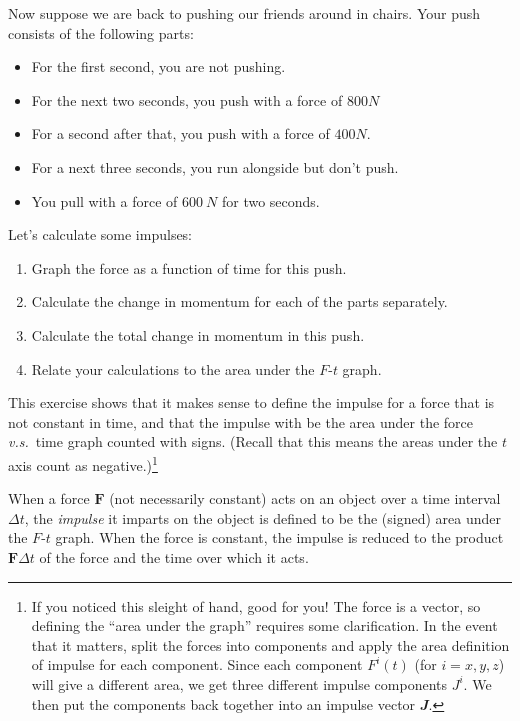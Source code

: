 \begin{exercise}
Now suppose we are back to pushing our friends around in chairs. 
Your push consists of the following parts:
\begin{itemize}
\item For the first second, you are not pushing. 
\item For the next two seconds, you push with a force of $800 N$ 
\item For a second after that, you push with a force of $400 N$. 
\item For a next three seconds, you run alongside but don't push. 
\item You pull with a force of $600\ N$ for two seconds.
\end{itemize}
Let's calculate some impulses:
\begin{enumerate}
\item Graph the force as a function of time for this push.
\item Calculate the change in momentum for each of the parts separately. 
\item Calculate the total change in momentum in this push.
\item Relate your calculations to the area under the $F$-$t$ graph. 
\end{enumerate}
\end{exercise}
This exercise shows that it makes sense to define the impulse for a force that is not constant in time, and that the impulse with be the area under the force {\it v.s.}\ time graph counted with signs. (Recall that this means the areas under the $t$ axis count as negative.)\footnote{If you noticed this sleight of hand, good for you! The force is a vector, so defining the “area under the graph” requires some clarification. In the event that it matters, split the forces into components and apply the area definition of impulse for each component. Since each component $F^i(t)$ (for $i=x,y,z$) will give a different area, we get three different impulse components $J^i$. We then put the components back together into an impulse vector $𝑱$.}
\begin{definition}[Impulse]
When a force $𝐅$ (not necessarily constant) acts on an object over a time interval $Δt$, the {\em impulse} it imparts on the object is defined to be the (signed) area under the $F$-$t$ graph. When the force is constant, the impulse is reduced to the product $𝐅Δt$ of the force and the time over which it acts. 
\end{definition}

